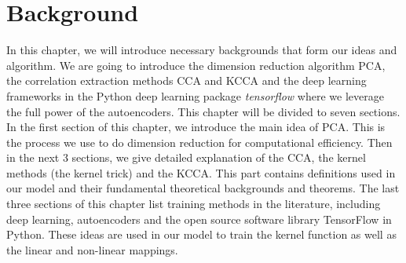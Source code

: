 \documentclass[12pt]{report} %
\begin{document}
\chapter{Background}
In this chapter, we will introduce necessary backgrounds that form our ideas and algorithm. We are going to introduce the dimension reduction algorithm PCA, the correlation extraction methods CCA and KCCA and the deep learning frameworks in the Python deep learning package \textit{tensorflow} where we leverage the full power of the autoencoders.
This chapter will be divided to seven sections. In the first section of this chapter, we introduce the main idea of PCA. This is the process we use to do dimension reduction for computational efficiency. Then in the next 3 sections, we give detailed explanation of the CCA, the kernel methods (the kernel trick) and the KCCA. This part contains definitions used in our model and their fundamental theoretical backgrounds and theorems. The last three sections of this chapter list training methods in the literature, including deep learning, autoencoders and the open source software library TensorFlow\cite{TF,TF2,TF3} in Python. These ideas are used in our model to train the kernel function as well as the linear and non-linear mappings.
\end{document}
